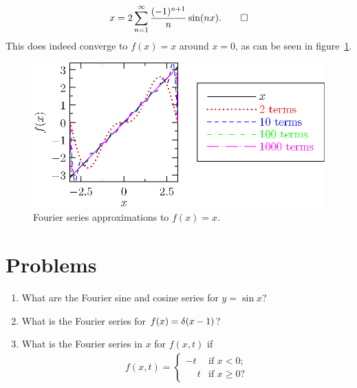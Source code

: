 \documentclass{book}
\begin{document}
{\begin{align}
\label{Fourierx}
x = 2 \sum_{n=1}^\infty  \frac{(-1)^{n+1}}{n} \sin(nx). \qed
\end{align}
This does indeed converge to $f(x)=x$ around $x=0$, as can be seen in
figure~\ref{fourierx}.
\begin{figure}[htbp]
  \begin{center}
    \includegraphics{201/fourierx}
    \caption{Fourier series approximations to $f(x)=x$.}
    \label{fourierx}
  \end{center}
\end{figure}
}


\section{Problems}

\begin{enumerate}
  \item
    What are the Fourier sine and cosine series for
    $y=\sin x$?
  \item
    What is the Fourier series for $ f(x) = \delta(x-1)$?

  \item What is the Fourier series in $x$ for $f(x,t)$ if
    \begin{align}
    f(x,t) =
    \left\{ \begin{array}{ll}
      -t           & \mbox{if $x < 0$};\\
      \phantom{-}t & \mbox{if $x \geq 0$}?
    \end{array} \right.
    \end{align}

\end{enumerate}
\end{document}

